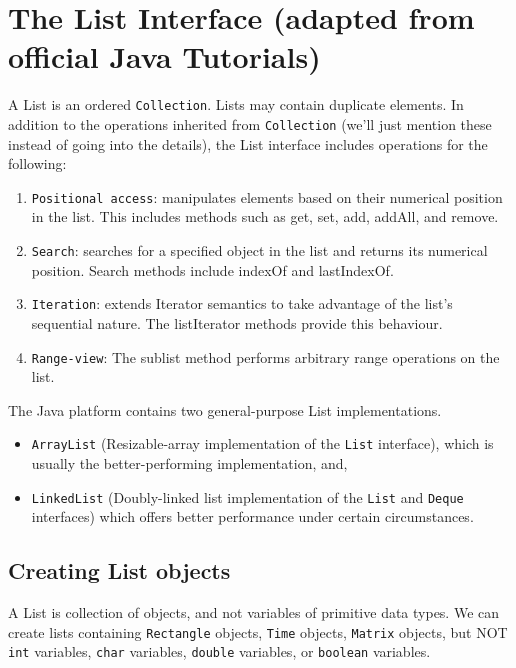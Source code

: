 \section{The List Interface (adapted from official Java Tutorials)}

A List is an ordered \texttt{Collection}. Lists may contain duplicate elements. In addition to the operations inherited from \texttt{Collection} (we'll just mention these instead of going into the details), the List interface includes operations for the following:

\begin{enumerate}
  	\item \texttt{Positional access}: manipulates elements based on their numerical position in the list. This includes methods such as get, set, add, addAll, and remove.
	\item \texttt{Search}: searches for a specified object in the list and returns its numerical position. Search methods include indexOf and lastIndexOf.
	\item \texttt{Iteration}: extends Iterator semantics to take advantage of the list's sequential nature. The listIterator methods provide this behaviour.
	\item \texttt{Range-view}: The sublist method performs arbitrary range operations on the list.
\end{enumerate}

The Java platform contains two general-purpose List implementations. 
\begin{itemize}
\item \texttt{ArrayList} (Resizable-array implementation of the \texttt{List} interface), which is usually the better-performing implementation, and,
\item \texttt{LinkedList} (Doubly-linked list implementation of the \texttt{List} and \texttt{Deque} interfaces) which offers better performance under certain circumstances.
\end{itemize}

\subsection{Creating List objects}

A List is collection of objects, and not variables of primitive data types. We can create lists containing \texttt{Rectangle} objects, \texttt{Time} objects, \texttt{Matrix} objects, but \color{red} NOT \color{black} \texttt{int} variables, \texttt{char} variables, \texttt{double} variables, or \texttt{boolean} variables.

